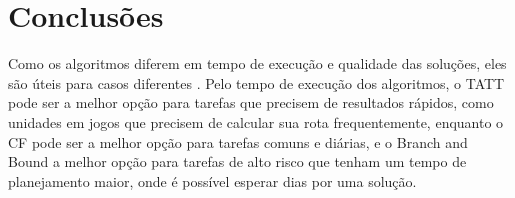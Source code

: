 \documentclass[12pt]{article}
\begin{document}
\pagebreak

\section{Conclusões}
Como os algoritmos diferem em tempo de execução e qualidade das soluções, eles
são úteis para casos diferentes \cite{lawler1985traveling}.
Pelo tempo de execução dos algoritmos, o TATT
pode ser a melhor opção para tarefas que precisem de resultados rápidos,
como unidades em jogos que precisem de calcular sua rota frequentemente,
enquanto o CF pode ser a melhor opção para tarefas comuns e diárias, e o
Branch and Bound a melhor opção para tarefas de alto risco que tenham um tempo
de planejamento maior, onde é possível esperar dias por uma solução.

\pagebreak



\end{document}
